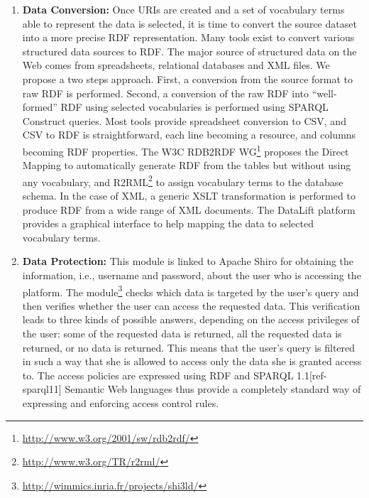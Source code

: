 \begin{itemize}
\begin{enumerate}
\item{\textbf{Data Conversion:}}
Once URIs are created and a set of vocabulary terms able to represent the data is selected, it is time to convert the source dataset into a more precise RDF representation. Many tools exist to convert various structured data sources to RDF. The major source of structured data on the Web comes from spreadsheets, relational databases and XML files. We propose a two steps approach. First, a conversion from the source format to raw RDF is performed. Second, a conversion of the raw RDF into ``well-formed'' RDF using selected vocabularies is performed using SPARQL Construct queries. Most tools provide spreadsheet conversion to CSV, and CSV to RDF is straightforward, each line becoming a resource, and columns becoming RDF properties. The W3C RDB2RDF WG\footnote{\url{http://www.w3.org/2001/sw/rdb2rdf/}} proposes the Direct Mapping to automatically generate RDF from the tables but without using any vocabulary, and R2RML\footnote{\url{http://www.w3.org/TR/r2rml/}}  to assign vocabulary terms to the database schema. In the case of XML, a generic XSLT transformation is performed to produce RDF from a wide range of XML documents. The DataLift platform provides a graphical interface to help mapping the data to selected vocabulary terms.

\item {\textbf{Data Protection:}}
This module is linked to Apache Shiro for obtaining the information, i.e., username and password, about the user who is accessing the platform. The module\footnote{\url{http://wimmics.inria.fr/projects/shi3ld/}} checks which data is targeted by the user's query and then verifies whether the user can access the requested data. This verification leads to three kinds of possible answers, depending on the access privileges of the user: some of the requested data is returned, all the requested data is returned, or no data is returned. This means that the user's query is filtered in such a way that she is allowed to access only the data she is granted access to. The access policies are expressed using RDF and SPARQL 1.1[ref-sparql11] Semantic Web languages thus provide a completely standard way of expressing and enforcing access control rules.


\end{enumerate}
\end{itemize}
